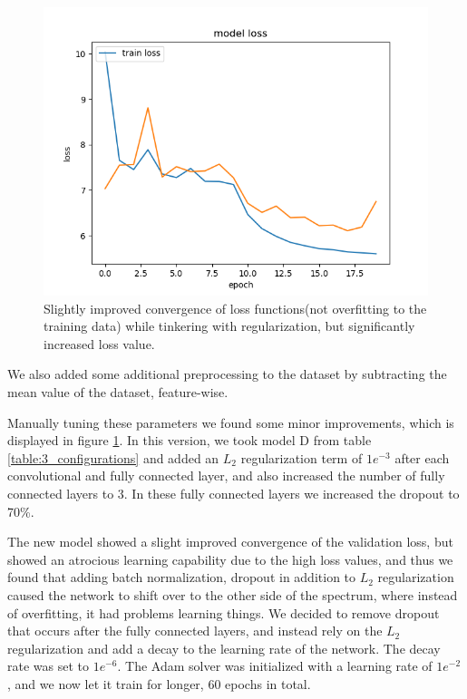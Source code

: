 \documentclass{kthreport}
\begin{document}
\begin{figure}
  \includegraphics[width=\linewidth]{../images/improved_loss_1.png}
  \caption[]
  {\small Slightly improved convergence of loss functions(not overfitting to the training data) while tinkering with regularization, but significantly increased loss value.}
  \label{fig:loss_improved_1}
\end{figure}
\FloatBarrier

We also added some additional preprocessing to the dataset by subtracting the mean value of the dataset, feature-wise.

Manually tuning these parameters we found some minor improvements, which is displayed in figure \ref{fig:loss_improved_1}. In this version, we took model D from table \ref{table:3_configurations} and added an $L_{2}$ regularization term of $1e^{-3}$ after each convolutional and fully connected layer, and also increased the number of fully connected layers to 3. In these fully connected layers we increased the dropout to 70\%.


The new model showed a slight improved convergence of the validation loss, but showed an atrocious learning capability due to the high loss values, and thus we found that adding batch normalization, dropout in addition to $L_{2}$ regularization caused the network to shift over to the other side of the spectrum, where instead of overfitting, it had problems learning things. We decided to remove dropout that occurs after the fully connected layers, and instead rely on the $L_{2}$ regularization and add a decay to the learning rate of the network. The decay rate was set to $1e^{-6}$. The Adam solver was initialized with a learning rate of $1e^{-2}$, and we now let it train for longer, 60 epochs in total.
\end{document}
